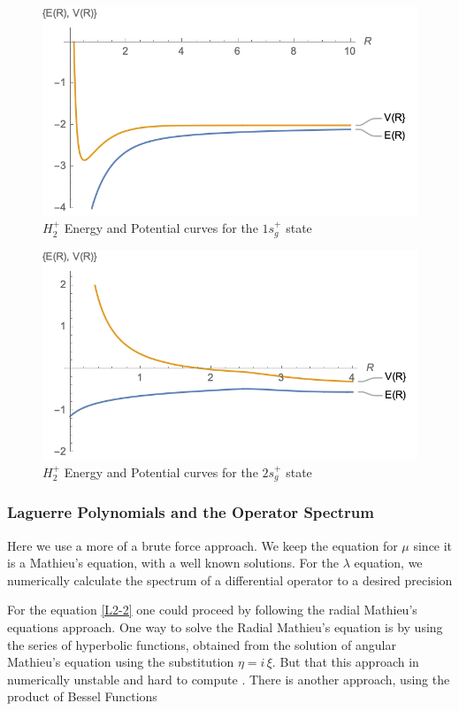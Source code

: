 \begin{figure}
  \includegraphics{H2_1Sg-Potential.png}
  \caption{$ H_2^{+} $ Energy and Potential curves for the $ 1s_g^{+} $ state}
\end{figure}

\begin{figure}
  \includegraphics{H2_2Sg-Potential.png}
  \caption{$ H_2^{+} $ Energy and Potential curves for the $ 2s_g^{+} $ state}
\end{figure}

\subsubsection{Laguerre Polynomials and the Operator Spectrum}

Here we use a more of a brute force approach. We keep the equation for $ \mu $ since it is a Mathieu's equation, with a well known solutions. For the $ \lambda $ equation, we  numerically calculate the spectrum of a differential operator to a desired precision

For the equation \eqref{L2-2} one could proceed by following the radial Mathieu's equations approach. One way to solve the Radial Mathieu's equation is by using the series of hyperbolic functions, obtained from the solution of angular Mathieu's equation using the substitution $ \eta = i\,\xi$.  But that this approach in numerically unstable and hard to compute \cite{Mathieu4}. There is another approach, using the product of Bessel Functions \cite{Mathieu4}

